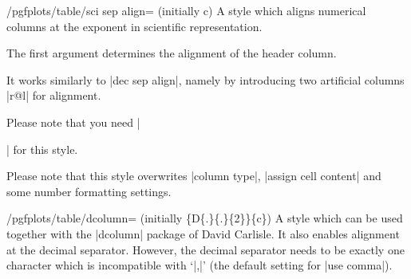 \documentclass[a4paper]{ltxdoc}
\begin{document}
%

%
%
%

\begin{stylekey}{/pgfplots/table/sci sep align= (initially c)}
    A style which aligns numerical columns at the exponent in scientific
    representation.

    The first argument determines the alignment of the header column.

    It works similarly to |dec sep align|, namely by introducing two
    artificial columns |r@{}l| for alignment.

    Please note that you need |\usepackage{array}| for this style.

    Please note that this style overwrites |column type|, |assign cell content|
    and some number formatting settings.
\end{stylekey}

\begin{stylekey}{/pgfplots/table/dcolumn= (initially \{D\{.\}\{.\}\{2\}\}\{c\})}
    A style which can be used together with the |dcolumn| package of David
    Carlisle. It also enables alignment at the decimal separator. However, the
    decimal separator needs to be exactly one character which is incompatible
    with `|{,}|' (the default setting for |use comma|).
\end{stylekey}
\end{document}
